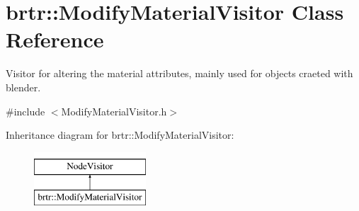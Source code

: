 \hypertarget{classbrtr_1_1_modify_material_visitor}{\section{brtr\+:\+:Modify\+Material\+Visitor Class Reference}
\label{classbrtr_1_1_modify_material_visitor}
}


Visitor for altering the material attributes, mainly used for objects craeted with blender.  




{\ttfamily \#include $<$Modify\+Material\+Visitor.\+h$>$}

Inheritance diagram for brtr\+:\+:Modify\+Material\+Visitor\+:\begin{figure}[H]
\begin{center}
\leavevmode
\includegraphics[height=2.000000cm]{classbrtr_1_1_modify_material_visitor}
\end{center}
\end{figure}
